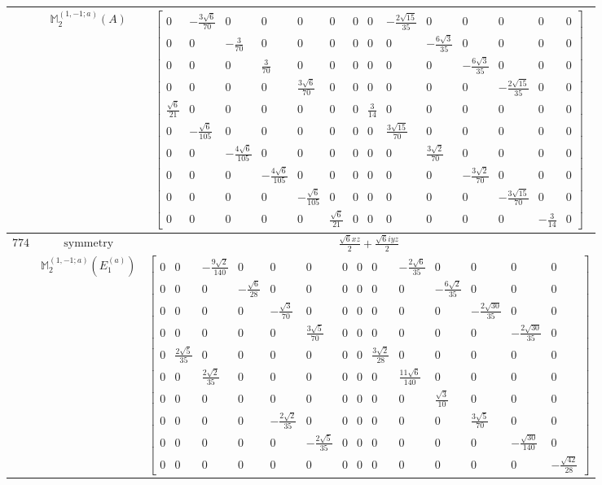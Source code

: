 \documentclass[fleqn,8pt,landscape]{jsarticle}
\begin{document}
\begin{longtable}{ccc}
$  $ & $ \mathbb{M}_{2}^{(1,-1;a)}(A) $ & $ \begin{bmatrix} 0 & - \frac{3 \sqrt{6}}{70} & 0 & 0 & 0 & 0 & 0 & 0 & - \frac{2 \sqrt{15}}{35} & 0 & 0 & 0 & 0 & 0 \\ 0 & 0 & - \frac{3}{70} & 0 & 0 & 0 & 0 & 0 & 0 & - \frac{6 \sqrt{3}}{35} & 0 & 0 & 0 & 0 \\ 0 & 0 & 0 & \frac{3}{70} & 0 & 0 & 0 & 0 & 0 & 0 & - \frac{6 \sqrt{3}}{35} & 0 & 0 & 0 \\ 0 & 0 & 0 & 0 & \frac{3 \sqrt{6}}{70} & 0 & 0 & 0 & 0 & 0 & 0 & - \frac{2 \sqrt{15}}{35} & 0 & 0 \\ \frac{\sqrt{6}}{21} & 0 & 0 & 0 & 0 & 0 & 0 & \frac{3}{14} & 0 & 0 & 0 & 0 & 0 & 0 \\ 0 & - \frac{\sqrt{6}}{105} & 0 & 0 & 0 & 0 & 0 & 0 & \frac{3 \sqrt{15}}{70} & 0 & 0 & 0 & 0 & 0 \\ 0 & 0 & - \frac{4 \sqrt{6}}{105} & 0 & 0 & 0 & 0 & 0 & 0 & \frac{3 \sqrt{2}}{70} & 0 & 0 & 0 & 0 \\ 0 & 0 & 0 & - \frac{4 \sqrt{6}}{105} & 0 & 0 & 0 & 0 & 0 & 0 & - \frac{3 \sqrt{2}}{70} & 0 & 0 & 0 \\ 0 & 0 & 0 & 0 & - \frac{\sqrt{6}}{105} & 0 & 0 & 0 & 0 & 0 & 0 & - \frac{3 \sqrt{15}}{70} & 0 & 0 \\ 0 & 0 & 0 & 0 & 0 & \frac{\sqrt{6}}{21} & 0 & 0 & 0 & 0 & 0 & 0 & - \frac{3}{14} & 0 \end{bmatrix} $ \\ \hline
$ 774 $ & $ \text{symmetry} $ & $ \frac{\sqrt{6} x z}{2} + \frac{\sqrt{6} i y z}{2} $ \\
$  $ & $ \mathbb{M}_{2}^{(1,-1;a)}(E_{1}^{(a)}) $ & $ \begin{bmatrix} 0 & 0 & - \frac{9 \sqrt{2}}{140} & 0 & 0 & 0 & 0 & 0 & 0 & - \frac{2 \sqrt{6}}{35} & 0 & 0 & 0 & 0 \\ 0 & 0 & 0 & - \frac{\sqrt{6}}{28} & 0 & 0 & 0 & 0 & 0 & 0 & - \frac{6 \sqrt{2}}{35} & 0 & 0 & 0 \\ 0 & 0 & 0 & 0 & - \frac{\sqrt{3}}{70} & 0 & 0 & 0 & 0 & 0 & 0 & - \frac{2 \sqrt{30}}{35} & 0 & 0 \\ 0 & 0 & 0 & 0 & 0 & \frac{3 \sqrt{5}}{70} & 0 & 0 & 0 & 0 & 0 & 0 & - \frac{2 \sqrt{30}}{35} & 0 \\ 0 & \frac{2 \sqrt{5}}{35} & 0 & 0 & 0 & 0 & 0 & 0 & \frac{3 \sqrt{2}}{28} & 0 & 0 & 0 & 0 & 0 \\ 0 & 0 & \frac{2 \sqrt{2}}{35} & 0 & 0 & 0 & 0 & 0 & 0 & \frac{11 \sqrt{6}}{140} & 0 & 0 & 0 & 0 \\ 0 & 0 & 0 & 0 & 0 & 0 & 0 & 0 & 0 & 0 & \frac{\sqrt{3}}{10} & 0 & 0 & 0 \\ 0 & 0 & 0 & 0 & - \frac{2 \sqrt{2}}{35} & 0 & 0 & 0 & 0 & 0 & 0 & \frac{3 \sqrt{5}}{70} & 0 & 0 \\ 0 & 0 & 0 & 0 & 0 & - \frac{2 \sqrt{5}}{35} & 0 & 0 & 0 & 0 & 0 & 0 & - \frac{\sqrt{30}}{140} & 0 \\ 0 & 0 & 0 & 0 & 0 & 0 & 0 & 0 & 0 & 0 & 0 & 0 & 0 & - \frac{\sqrt{42}}{28} \end{bmatrix} $ \\ \hline

\end{longtable}
\end{document}

